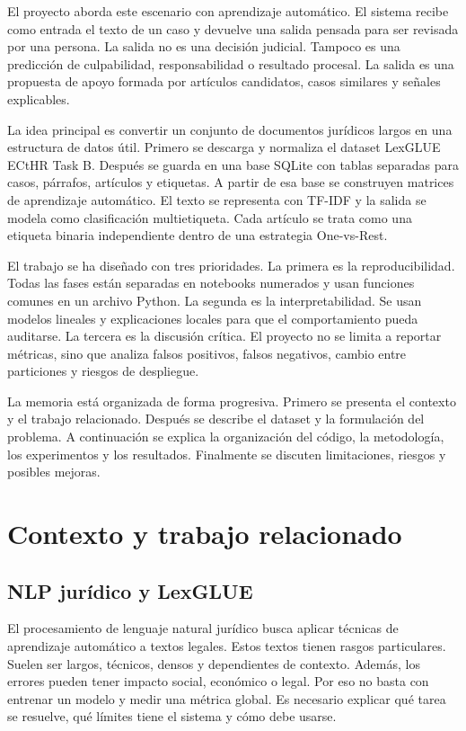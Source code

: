\documentclass[11pt,a4paper]{article}
\begin{document}
El proyecto aborda este escenario con aprendizaje automático. El sistema recibe como entrada el texto de un caso y devuelve una salida pensada para ser revisada por una persona. La salida no es una decisión judicial. Tampoco es una predicción de culpabilidad, responsabilidad o resultado procesal. La salida es una propuesta de apoyo formada por artículos candidatos, casos similares y señales explicables.

La idea principal es convertir un conjunto de documentos jurídicos largos en una estructura de datos útil. Primero se descarga y normaliza el dataset LexGLUE ECtHR Task B. Después se guarda en una base SQLite con tablas separadas para casos, párrafos, artículos y etiquetas. A partir de esa base se construyen matrices de aprendizaje automático. El texto se representa con TF-IDF y la salida se modela como clasificación multietiqueta. Cada artículo se trata como una etiqueta binaria independiente dentro de una estrategia One-vs-Rest.

El trabajo se ha diseñado con tres prioridades. La primera es la reproducibilidad. Todas las fases están separadas en notebooks numerados y usan funciones comunes en un archivo Python. La segunda es la interpretabilidad. Se usan modelos lineales y explicaciones locales para que el comportamiento pueda auditarse. La tercera es la discusión crítica. El proyecto no se limita a reportar métricas, sino que analiza falsos positivos, falsos negativos, cambio entre particiones y riesgos de despliegue.

La memoria está organizada de forma progresiva. Primero se presenta el contexto y el trabajo relacionado. Después se describe el dataset y la formulación del problema. A continuación se explica la organización del código, la metodología, los experimentos y los resultados. Finalmente se discuten limitaciones, riesgos y posibles mejoras.

\section{Contexto y trabajo relacionado}
\label{sec_contexto}

\subsection{NLP jurídico y LexGLUE}

El procesamiento de lenguaje natural jurídico busca aplicar técnicas de aprendizaje automático a textos legales. Estos textos tienen rasgos particulares. Suelen ser largos, técnicos, densos y dependientes de contexto. Además, los errores pueden tener impacto social, económico o legal. Por eso no basta con entrenar un modelo y medir una métrica global. Es necesario explicar qué tarea se resuelve, qué límites tiene el sistema y cómo debe usarse.
\end{document}
